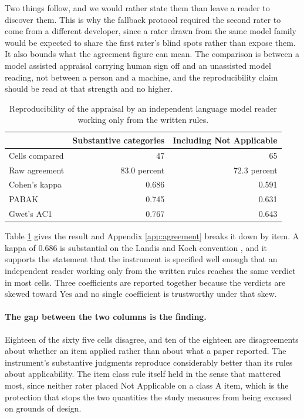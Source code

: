 \documentclass{article}
\begin{document}
Two things follow, and we would rather state them than leave a reader to discover them. This is why
the fallback protocol required the second rater to come from a different developer, since a rater
drawn from the same model family would be expected to share the first rater's blind spots rather
than expose them. It also bounds what the agreement figure can mean. The comparison is between a
model assisted appraisal carrying human sign off and an unassisted model reading, not between a
person and a machine, and the reproducibility claim should be read at that strength and no higher.

\begin{table}[t]
  \caption{Reproducibility of the appraisal by an independent language model reader working only
  from the written rules.}
  \label{tab:agree}
  \centering
  \begin{tabular}{lrr}
    \toprule
    & Substantive categories & Including Not Applicable \\
    \midrule
    Cells compared            & 47    & 65 \\
    Raw agreement             & 83.0 percent & 72.3 percent \\
    Cohen's kappa             & 0.686 & 0.591 \\
    PABAK                     & 0.745 & 0.631 \\
    Gwet's AC1                & 0.767 & 0.643 \\
    \bottomrule
  \end{tabular}
\end{table}

Table \ref{tab:agree} gives the result and Appendix \ref{app:agreement} breaks it down by item. A
kappa of 0.686 is substantial on the Landis and Koch convention \cite{landis1977}, and it supports
the statement that
the instrument is specified well enough that an independent reader working only from the written
rules reaches the same verdict in most cells. Three coefficients are reported together because the
verdicts are skewed toward Yes and no single coefficient is trustworthy under that skew.

\paragraph{The gap between the two columns is the finding.} Eighteen of the sixty five cells
disagree, and ten of the eighteen are disagreements about whether an item applied rather than about
what a paper reported. The instrument's substantive judgments reproduce considerably better than its
rules about applicability. The item class rule itself held in the sense that mattered most, since
neither rater placed Not Applicable on a class A item, which is the protection that stops the two
quantities the study measures from being excused on grounds of design.
\end{document}
